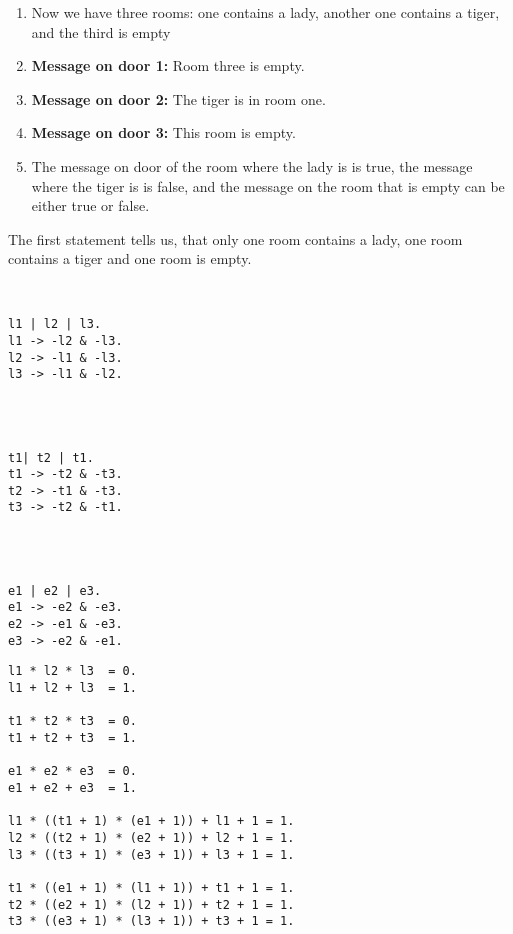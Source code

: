 \begin{enumerate}

\item Now we have three rooms: one contains a lady, another one contains a tiger, and the third is empty 

\item \textbf{Message on door 1:} Room three is empty.

\item \textbf{Message on door 2:} The tiger is in room one.

\item \textbf{Message on door 3:} This room is empty.


\item The message on door of the room where the lady is is true, the message where the tiger is is false, and the message on the room that is empty can be either true or false.

\end{enumerate}

The first statement tells us, that only one room contains a lady, one room contains a tiger and one room is empty.


\begin{multicols}{2}
\begin{lstlisting}[numbers=none,title=Propositional logic]


l1 | l2 | l3.
l1 -> -l2 & -l3.
l2 -> -l1 & -l3.
l3 -> -l1 & -l2.
 


 
t1| t2 | t1.
t1 -> -t2 & -t3.
t2 -> -t1 & -t3.
t3 -> -t2 & -t1.




e1 | e2 | e3.
e1 -> -e2 & -e3.
e2 -> -e1 & -e3.
e3 -> -e2 & -e1.

\end{lstlisting}

\begin{lstlisting}[numbers=none,title=Modular arithmetics]
l1 * l2 * l3  = 0.
l1 + l2 + l3  = 1.

t1 * t2 * t3  = 0.
t1 + t2 + t3  = 1.

e1 * e2 * e3  = 0.
e1 + e2 + e3  = 1.

l1 * ((t1 + 1) * (e1 + 1)) + l1 + 1 = 1.
l2 * ((t2 + 1) * (e2 + 1)) + l2 + 1 = 1.
l3 * ((t3 + 1) * (e3 + 1)) + l3 + 1 = 1.

t1 * ((e1 + 1) * (l1 + 1)) + t1 + 1 = 1.
t2 * ((e2 + 1) * (l2 + 1)) + t2 + 1 = 1.
t3 * ((e3 + 1) * (l3 + 1)) + t3 + 1 = 1.

\end{lstlisting}
\end{multicols}

